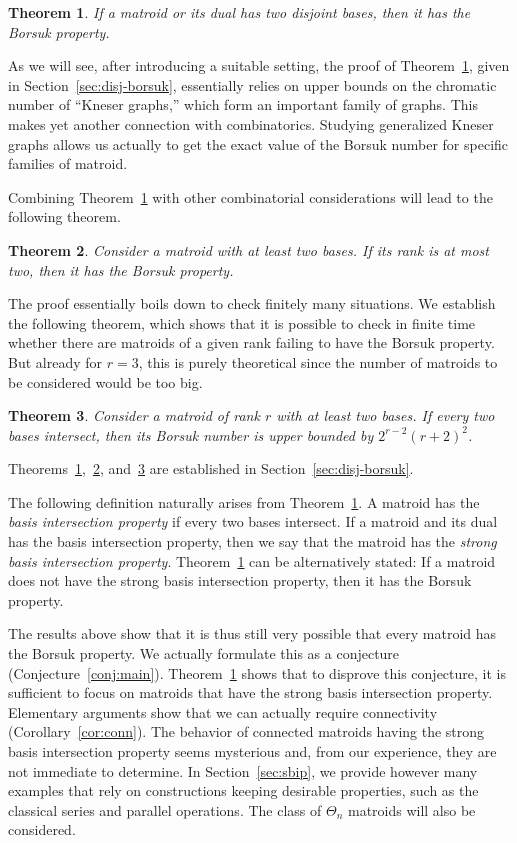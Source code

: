 \documentclass[12pt]{amsart}
\theoremstyle{plain}
\newtheorem{theorem}{Theorem}[section]
\theoremstyle{definition}
\theoremstyle{remark}
\begin{document}
\begin{theorem}\label{thm:main} If a matroid or its dual has two disjoint bases, then it has the Borsuk property.
\end{theorem}

As we will see, after introducing a suitable setting, the proof of Theorem~\ref{thm:main}, given in Section~\ref{sec:disj-borsuk}, essentially relies on upper bounds on  the chromatic number of ``Kneser graphs,'' which form an important family of graphs. This makes yet another connection with combinatorics. Studying generalized Kneser graphs allows us actually to get the exact value of the Borsuk number for specific families of matroid.

Combining Theorem~\ref{thm:main} with other combinatorial considerations will lead to the following theorem.

\begin{theorem}\label{thm:rank2}
Consider a matroid with at least two bases. If its rank is at most two, then it has the Borsuk property.
\end{theorem}

The proof essentially boils down to check finitely many situations. We establish the following theorem, which shows that it is possible to check in finite time whether there are matroids of a given rank failing to have the Borsuk property. But already for $r=3$, this is purely theoretical since the number of matroids to be considered would be too big.

\begin{theorem}\label{thm:rankr}
Consider a matroid of rank $r$ with at least two bases. If every two bases intersect, then its Borsuk number is upper bounded by $2^{r-2}(r+2)^2$.
\end{theorem}

Theorems~\ref{thm:main},~\ref{thm:rank2}, and~\ref{thm:rankr} are established in Section~\ref{sec:disj-borsuk}.

The following definition naturally arises from Theorem~\ref{thm:main}. A matroid has the {\em basis intersection property} if every two bases intersect. If a matroid and its dual has the basis intersection property, then we say that the matroid has the {\em strong basis intersection property}. Theorem~\ref{thm:main} can be alternatively stated: If a matroid does not have the strong basis intersection property, then it has the Borsuk property.

The results above show that it is thus still very possible that every matroid has the Borsuk property. We actually formulate this as a conjecture (Conjecture~\ref{conj:main}). Theorem~\ref{thm:main} shows that to disprove this conjecture, it is sufficient to focus on matroids that have the strong basis intersection property. Elementary arguments show that we can actually require connectivity (Corollary~\ref{cor:conn}). The behavior of connected matroids having the strong basis intersection property seems mysterious and, from our experience, they are not immediate to determine. In Section~\ref{sec:sbip}, we provide however many examples that rely on constructions keeping desirable properties, such as the classical series and parallel operations. The class of $\Theta_n$ matroids will also be considered.
\end{document}
